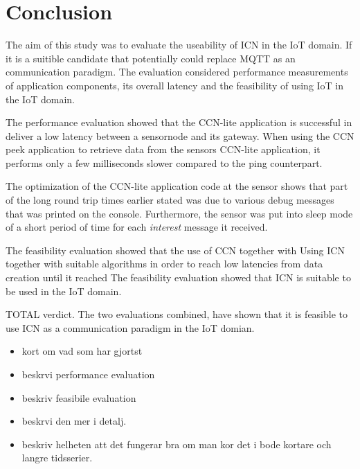 \section{Conclusion}

%
%

The aim of this study was to evaluate the useability of ICN in the IoT domain. If it is a suitible candidate that potentially could replace MQTT as an communication paradigm.
The evaluation considered performance measurements of application components, its overall latency and the feasibility of using IoT in the IoT domain.

The performance evaluation showed that the CCN-lite application is successful in deliver a low latency between a sensornode and its gateway. 
When using the CCN peek application to retrieve data from the sensors CCN-lite application, it performs only a few milliseconds slower compared to the ping counterpart.

The optimization of the CCN-lite application code at the sensor shows that part of the long round trip times earlier stated was due to various debug messages that was printed on the console. Furthermore, the sensor was put into sleep mode of a short period of time for each \textit{interest} message it received. 

The feasibility evaluation showed that the use of CCN together with
Using ICN together with suitable algorithms in order to reach low latencies from data creation until it reached 
The feasibility evaluation showed that ICN is suitable to be used in the IoT domain.


TOTAL verdict.
The two evaluations combined, have shown that it is feasible to use ICN as a communication paradigm in the IoT domian. 




\begin{itemize}
\item kort om vad som har gjortst
\item beskrvi performance evaluation
\item beskriv feasibile evaluation
\item beskrvi den mer i detalj.
\item beskriv helheten att det fungerar bra om man kor det i bode kortare och langre tidsserier.
\end{itemize}



